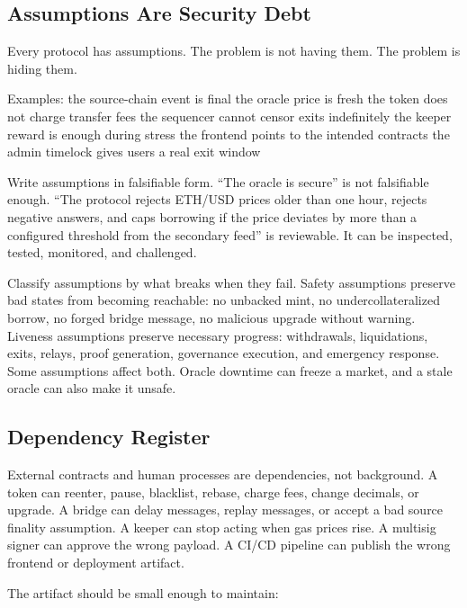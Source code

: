 \subsection{Assumptions Are Security Debt}

Every protocol has assumptions. The problem is not having them. The problem is hiding them.

\begin{codeblock}
Examples:
    the source-chain event is final
    the oracle price is fresh
    the token does not charge transfer fees
    the sequencer cannot censor exits indefinitely
    the keeper reward is enough during stress
    the frontend points to the intended contracts
    the admin timelock gives users a real exit window
\end{codeblock}

Write assumptions in falsifiable form. ``The oracle is secure'' is not falsifiable enough. ``The protocol rejects ETH/USD prices older than one hour, rejects negative answers, and caps borrowing if the price deviates by more than a configured threshold from the secondary feed'' is reviewable. It can be inspected, tested, monitored, and challenged.

Classify assumptions by what breaks when they fail. Safety assumptions preserve bad states from becoming reachable: no unbacked mint, no undercollateralized borrow, no forged bridge message, no malicious upgrade without warning. Liveness assumptions preserve necessary progress: withdrawals, liquidations, exits, relays, proof generation, governance execution, and emergency response. Some assumptions affect both. Oracle downtime can freeze a market, and a stale oracle can also make it unsafe.

\subsection{Dependency Register}

External contracts and human processes are dependencies, not background. A token can reenter, pause, blacklist, rebase, charge fees, change decimals, or upgrade. A bridge can delay messages, replay messages, or accept a bad source finality assumption. A keeper can stop acting when gas prices rise. A multisig signer can approve the wrong payload. A CI/CD pipeline can publish the wrong frontend or deployment artifact.

The artifact should be small enough to maintain:

